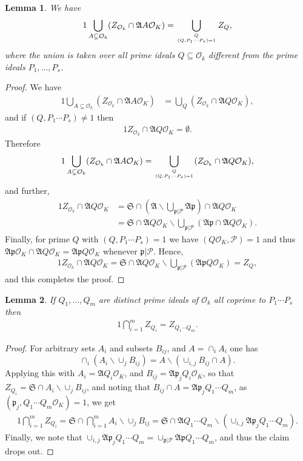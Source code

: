 \documentclass[11pt]{amsart}
\newtheorem{lemma}{Lemma}[section]
\numberwithin{equation}{eqncounter}
\def\Pc{\mathcal{P}}
\def\p{\mathfrak{p}}
\def\A{\mathfrak{A}}
\def\Z{Z}
\def\Sa{\mathfrak{S}}
\def\Oseen{{\mathcal{O}}}
\begin{document}
\begin{lemma}\label{lem: ZQunion}
We have 
\begin{alignat*}1
\bigcup_{A\subsetneq \Oseen_k}(\Z_{\Oseen_k}\cap \A A\Oseen_K)=\bigcup_{Q \atop (Q,P_1\cdots P_s)=1}\Z_Q,
\end{alignat*}
where the union is taken over all prime ideals $Q\subseteq \Oseen_k$ different from the prime ideals $P_1,\ldots,P_s$. 
\end{lemma}
\begin{proof}
We have
\begin{alignat*}1
\bigcup_{A\subsetneq \Oseen_k}(\Z_{\Oseen_k}\cap \A A\Oseen_K)&=\bigcup_{Q}(\Z_{\Oseen_k}\cap \A Q\Oseen_K),
\end{alignat*}
and if $(Q,P_1\cdots P_s)\neq 1$ then 
\begin{alignat*}1
\Z_{\Oseen_k}\cap \A Q\Oseen_K=\emptyset.
\end{alignat*}
Therefore
\begin{alignat*}1
\bigcup_{A\subsetneq \Oseen_k}(\Z_{\Oseen_k}\cap \A A\Oseen_K)=
\bigcup_{Q \atop (Q,P_1\cdots P_s)=1}(\Z_{\Oseen_k}\cap \A Q\Oseen_K),
\end{alignat*}
and further,
\begin{alignat*}1
Z_{\Oseen_k}\cap \A Q\Oseen_K&=\Sa \cap\left(\A\backslash \bigcup_{\p|\Pc}\A\p\right)\cap\A Q\Oseen_K\\
&=\Sa \cap \A Q\Oseen_K\backslash \bigcup_{\p|\Pc}(\A\p\cap \A Q\Oseen_K).
\end{alignat*}
Finally, for prime $Q$ with $(Q,P_1\cdots P_s)=1$ we have $(Q\Oseen_K,\Pc)=1$ and thus 
$\A\p\Oseen_K\cap \A Q\Oseen_K=\A\p Q\Oseen_K$ whenever $\p|\Pc$. Hence,
\begin{alignat*}1
Z_{\Oseen_k}\cap \A Q\Oseen_K=\Sa \cap\A Q\Oseen_K\backslash \bigcup_{\p|\Pc}(\A\p Q\Oseen_K)=\Z_Q,
\end{alignat*}
and this completes the proof.
\end{proof}



\begin{lemma}\label{lem: ZQintersection}
If $Q_1,\ldots, Q_m$ are distinct prime ideals of $\Oseen_k$ all coprime to $P_1\cdots P_s$ then
\begin{alignat*}1
\bigcap_{i=1}^m \Z_{Q_i}=\Z_{Q_1\cdots Q_m}.
\end{alignat*}
\end{lemma}
\begin{proof}
For arbitrary  sets $A_i$ and subsets $B_{ij}$, and $A=\cap_i A_i$ one has 
$$\cap_i (A_i\backslash \cup_j B_{ij})=A\backslash(\cup_{i,j} B_{ij}\cap A).$$
Applying this with $A_i=\A Q_i\Oseen_K$, and $B_{ij}=\A \p_j Q_i\Oseen_K$, so that
$Z_{Q_i}=\Sa\cap A_i\backslash \cup_j B_{ij}$, and noting that $B_{ij}\cap A=\A \p_j Q_1\cdots Q_m$, as $(\p_j,Q_1\cdots Q_m\Oseen_K)=1$,
we get
\begin{alignat*}1
\bigcap_{i=1}^m \Z_{Q_i}=\Sa\cap \bigcap_{i=1}^m A_i\backslash \cup_j B_{ij}=\Sa\cap \A Q_1\cdots Q_m\backslash(\cup_{i,j}\A \p_j Q_1\cdots Q_m).
\end{alignat*}
Finally, we note that $\cup_{i,j}\A \p_j Q_1\cdots Q_m=\cup_{\p|\Pc}\A \p Q_1\cdots Q_m$, and thus the claim drops out.
\end{proof}
\end{document}
